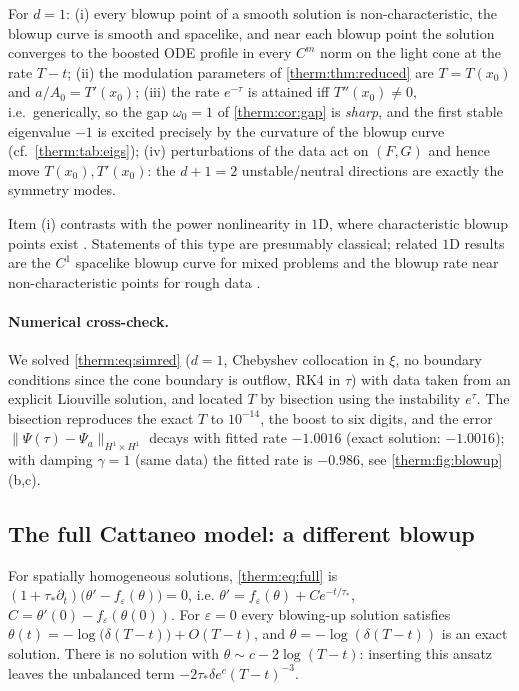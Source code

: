 \begin{corollary}\label{therm:cor:liouville}
For $d=1$: (i) every blowup point of a smooth solution is non-characteristic, the
blowup curve is smooth and spacelike, and near each blowup point the solution
converges to the boosted ODE profile in every $C^m$ norm on the light cone at the
rate $T-t$; (ii) the modulation parameters of \cref{therm:thm:reduced} are
$T=T(x_0)$ and $a/A_0=T'(x_0)$; (iii) the rate $e^{-\tau}$ is attained iff
$T''(x_0)\ne0$, i.e.\ generically, so the gap $\omega_0=1$ of
\cref{therm:cor:gap} is \emph{sharp}, and the first stable eigenvalue $-1$ is
excited precisely by the curvature of the blowup curve (cf.\ \cref{therm:tab:eigs});
(iv) perturbations of the data act on $(F,G)$ and hence move $T(x_0),T'(x_0)$: the
$d+1=2$ unstable/neutral directions are exactly the symmetry modes.
\end{corollary}
Item (i) contrasts with the power nonlinearity in $1$D, where characteristic
blowup points exist \cite{MerleZaag2007}.  Statements of this type are
presumably classical; related $1$D results are the $C^1$ spacelike blowup curve
for mixed problems \cite{Godin2000,Godin2001} and the blowup rate near
non-characteristic points for rough data \cite{AzaiezMasmoudiZaag2016}.

\paragraph{Numerical cross-check.}  We solved \cref{therm:eq:simred} ($d=1$,
Chebyshev collocation in $\xi$, no boundary conditions since the cone boundary is
outflow, RK4 in $\tau$) with data taken from an explicit Liouville solution, and
located $T$ by bisection using the instability $e^{\tau}$.  The bisection
reproduces the exact $T$ to $10^{-14}$, the boost to six digits, and the error
$\|\Psi(\tau)-\Psi_a\|_{H^1\times H^1}$ decays with fitted rate $-1.0016$ (exact
solution: $-1.0016$); with damping $\gamma=1$ (same data) the fitted rate is $-0.986$,
see \cref{therm:fig:blowup}(b,c).

\subsection{The full Cattaneo model: a different blowup}
\label{therm:sec:full}

\begin{proposition}\label{therm:prop:fullode}
For spatially homogeneous solutions, \cref{therm:eq:full} is
$(1+\tau_*\partial_t)\bigl(\theta'-f_\varepsilon(\theta)\bigr)=0$, i.e.
$\theta'=f_\varepsilon(\theta)+Ce^{-t/\tau_*}$, $C=\theta'(0)-f_\varepsilon(\theta(0))$.  For $\varepsilon=0$ every
blowing-up solution satisfies $\theta(t)=-\log\bigl(\delta(T-t)\bigr)+O(T-t)$, and
$\theta=-\log(\delta(T-t))$ is an exact solution.  There is no solution with
$\theta\sim c-2\log(T-t)$: inserting this ansatz leaves the unbalanced term
$-2\tau_*\delta e^{c}(T-t)^{-3}$.
\end{proposition}

